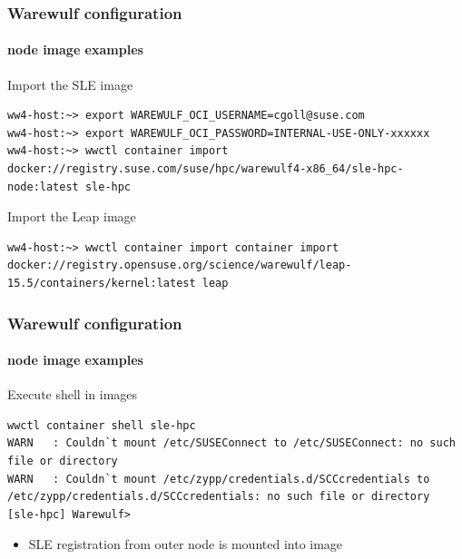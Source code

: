 \documentclass[aspectratio=169]{beamer}
\begin{document}
\begin{frame}[fragile]
\frametitle{Warewulf configuration}
\framesubtitle{node image examples}
\begin{block}{Import the SLE image}
\begin{lstlisting}[style=wwctl]
ww4-host:~> export WAREWULF_OCI_USERNAME=cgoll@suse.com
ww4-host:~> export WAREWULF_OCI_PASSWORD=INTERNAL-USE-ONLY-xxxxxx
ww4-host:~> wwctl container import docker://registry.suse.com/suse/hpc/warewulf4-x86_64/sle-hpc-node:latest sle-hpc
\end{lstlisting}
\end{block}
\begin{block}{Import the Leap image}
\begin{lstlisting}[style=wwctl]
ww4-host:~> wwctl container import container import docker://registry.opensuse.org/science/warewulf/leap-15.5/containers/kernel:latest leap
\end{lstlisting}
\end{block}
\end{frame}
\begin{frame}[fragile]
\frametitle{Warewulf configuration}
\framesubtitle{node image examples}
\begin{block}{Execute shell in images}
\begin{lstlisting}[style=wwctl]
wwctl container shell sle-hpc
WARN   : Couldn`t mount /etc/SUSEConnect to /etc/SUSEConnect: no such file or directory
WARN   : Couldn`t mount /etc/zypp/credentials.d/SCCcredentials to /etc/zypp/credentials.d/SCCcredentials: no such file or directory
[sle-hpc] Warewulf>
\end{lstlisting}
\begin{itemize}
  \item SLE registration from outer node is mounted into image
\end{itemize}
\end{block}
\end{frame}
\end{document}
